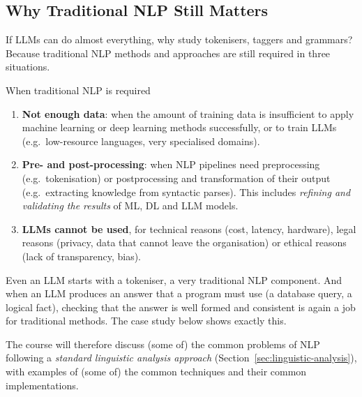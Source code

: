\subsection{Why Traditional NLP Still Matters}
\label{sec:why-traditional-nlp}

If LLMs can do almost everything, why study tokenisers, taggers and grammars? Because
traditional NLP methods and approaches are still required in three situations.

\begin{nbfact}{When traditional NLP is required}
\begin{enumerate}[nosep]
  \item \textbf{Not enough data}: when the amount of training data is insufficient to
        apply machine learning or deep learning methods successfully, or to train LLMs
        (e.g.\ low-resource languages, very specialised domains).
  \item \textbf{Pre- and post-processing}: when NLP pipelines need preprocessing (e.g.\
        tokenisation) or postprocessing and transformation of their output (e.g.\
        extracting knowledge from syntactic parses). This includes \emph{refining and
        validating the results} of ML, DL and LLM models.
  \item \textbf{LLMs cannot be used}, for technical reasons (cost, latency, hardware),
        legal reasons (privacy, data that cannot leave the organisation) or ethical
        reasons (lack of transparency, bias).
\end{enumerate}
\end{nbfact}

\begin{nbintuition}
Even an LLM starts with a tokeniser, a very traditional NLP component. And when an LLM
produces an answer that a program must use (a database query, a logical fact), checking
that the answer is well formed and consistent is again a job for traditional methods.
The case study below shows exactly this.
\end{nbintuition}

The course will therefore discuss (some of) the common problems of NLP following a
\emph{standard linguistic analysis approach} (Section~\ref{sec:linguistic-analysis}),
with examples of (some of) the common techniques and their common implementations.
